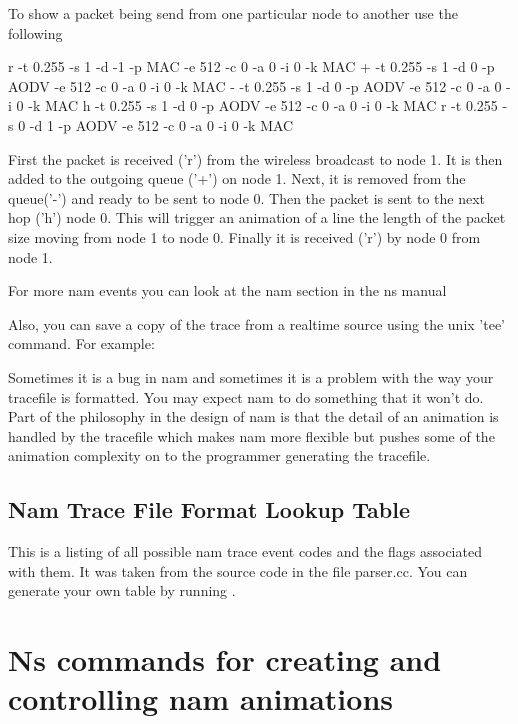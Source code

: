 To show a packet being send from one particular node to another use the
following

\begin{program}
r -t 0.255 -s 1 -d -1 -p MAC -e 512 -c 0 -a 0 -i 0 -k MAC
+ -t 0.255 -s 1 -d 0 -p AODV -e 512 -c 0 -a 0 -i 0 -k MAC
- -t 0.255 -s 1 -d 0 -p AODV -e 512 -c 0 -a 0 -i 0 -k MAC
h -t 0.255 -s 1 -d 0 -p AODV -e 512 -c 0 -a 0 -i 0 -k MAC
r -t 0.255 -s 0 -d 1 -p AODV -e 512 -c 0 -a 0 -i 0 -k MAC
\end{program}

First the packet is received ('r') from the wireless broadcast to node
1.  It is then added to the outgoing queue ('+') on node 1.  Next, it is
removed from the queue('-') and ready to be sent to node 0.  Then the
packet is sent to the next hop ('h') node 0.  This will trigger an
animation of a line the length of the packet size moving from node 1 to
node 0.  Finally it is received ('r') by node 0 from node 1.

For more nam events you can look at the nam section in the ns manual

Also, you can save a copy of the trace from a realtime
source using the unix 'tee' command. For example:

\begin{program}
\end{program}

Sometimes it is a bug in nam and sometimes it is a problem with the way
your tracefile is formatted.  You may expect nam to do something that it
won't do.  Part of the philosophy in the design of nam is that the detail of
an animation is handled by the tracefile which makes nam more flexible
but pushes some of the animation complexity on to the programmer
generating the tracefile. 

\subsection{Nam Trace File Format Lookup Table}
This is a listing of all possible nam trace event codes and the flags associated with them.  It was taken from the source code in the file parser.cc.  You can generate your own table by running .




\section{Ns commands for creating and controlling nam animations}
\label{sec:namcommands}

